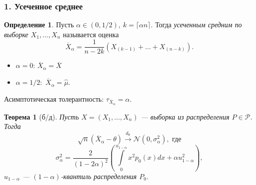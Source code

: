 \documentclass[12pt]{report}
\newtheorem{theorem}{Теорема}
\theoremstyle{definition}
\newtheorem{definition}{Определение}
\begin{document}
\subsubsection{1. Усеченное среднее}
\begin{definition}
	Пусть $\alpha \in (0, 1/2),\  k = \lceil \alpha n \rceil.$ Тогда \emph{усеченным средним по выборке $X_1, \dots, X_n$} называется оценка
	$$ \overline{X}_\alpha = \dfrac{1}{n-2k}(X_{(k-1)} + \dots + X_{(n - k)}).$$
\end{definition}
\begin{itemize}
	\item $\alpha = 0$: $\overline{X}_\alpha = \overline{X}$
  	\item $\alpha = 1/2:$ $\overline{X}_\alpha = \widehat{\mu}.$
\end{itemize}

Асимптотическая толерантность: $\tau_{\overline{X}_\alpha} = \alpha$.

\begin{theorem}[б/д]
	Пусть $X = (X_1, \dots, X_n)$ — выборка из  распределения $P \in \mathcal{P}$. Тогда
	$$ \sqrt{n}(\overline{X}_\alpha - \theta) \xrightarrow{d_\theta} \mathcal{N}(0, \sigma^2_\alpha), \text{ где}$$
	$$ \sigma^2_\alpha = \dfrac{2}{(1-2\alpha)^2}\left(\int\limits_0^{u_{1-\alpha}} x^2p_0(x)dx + \alpha u^2_{1-\alpha} \right), $$
	 $u_{1-\alpha}$ — $(1 - \alpha)$-квантиль распределения $P_0$.
\end{theorem}
\end{document}
